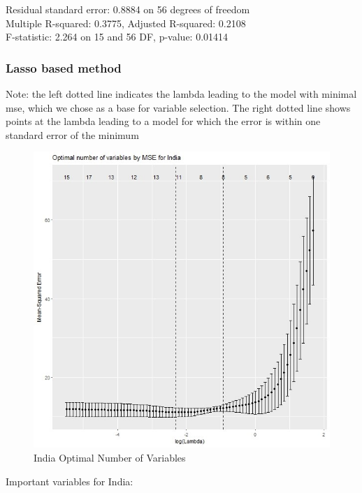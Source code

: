 \documentclass[11pt]{article}
\begin{document}
\FloatBarrier
Residual standard error: 0.8884 on 56 degrees of freedom \\
Multiple R-squared:  0.3775,	Adjusted R-squared:  0.2108 \\ 
F-statistic: 2.264 on 15 and 56 DF,  p-value: 0.01414

\newpage
\subsubsection{Lasso based method}

Note: the left dotted line indicates the lambda leading to the model with minimal mse, which we chose as a base for variable selection. The right dotted line shows points at the lambda leading to a model for which the error is within one standard error of the minimum

\FloatBarrier
\begin{figure}[!htb]
\begin{center}
\includegraphics[scale=0.85]{L1.jpg}
\caption{India Optimal Number of Variables}
\label{figure9}
\end{center}
\end{figure}
\FloatBarrier

Important variables for India:
\end{document}
